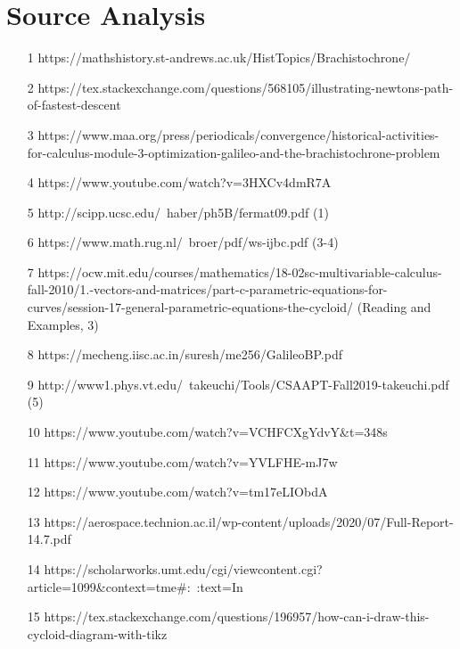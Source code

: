 \documentclass[12pt]{report}
\begin{document}
\chapter{Source Analysis}
\begin{itemize}
    \item [1] https://mathshistory.st-andrews.ac.uk/HistTopics/Brachistochrone/ 
    \item [2] https://tex.stackexchange.com/questions/568105/illustrating-newtons-path-of-fastest-descent
    \item [3] https://www.maa.org/press/periodicals/convergence/historical-activities-for-calculus-module-3-optimization-galileo-and-the-brachistochrone-problem
    \item [4] https://www.youtube.com/watch?v=3HXCv4dmR7A
    \item [5] http://scipp.ucsc.edu/~haber/ph5B/fermat09.pdf (1)
    \item [6] https://www.math.rug.nl/~broer/pdf/ws-ijbc.pdf (3-4)
    \item [7] https://ocw.mit.edu/courses/mathematics/18-02sc-multivariable-calculus-fall-2010/1.-vectors-and-matrices/part-c-parametric-equations-for-curves/session-17-general-parametric-equations-the-cycloid/ (Reading and Examples, 3)
    \item [8] https://mecheng.iisc.ac.in/suresh/me256/GalileoBP.pdf
    \item [9] http://www1.phys.vt.edu/~takeuchi/Tools/CSAAPT-Fall2019-takeuchi.pdf (5)
    \item [10] https://www.youtube.com/watch?v=VCHFCXgYdvY&t=348s
    \item [11] https://www.youtube.com/watch?v=YVLFHE-mJ7w
    \item [12] https://www.youtube.com/watch?v=tm17eLIObdA
    \item [13] https://aerospace.technion.ac.il/wp-content/uploads/2020/07/Full-Report-14.7.pdf
    \item [14] https://scholarworks.umt.edu/cgi/viewcontent.cgi?article=1099&context=tme#:~:text=In
    \item [15] https://tex.stackexchange.com/questions/196957/how-can-i-draw-this-cycloid-diagram-with-tikz
    \\
    \\

\end{itemize}
\end{document}
